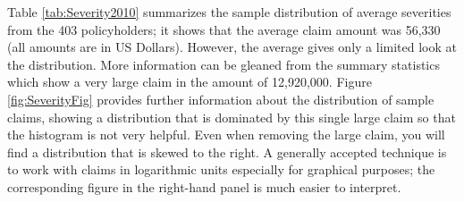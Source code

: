 \documentclass[]{book}
\theoremstyle{definition}
\theoremstyle{definition}
\theoremstyle{definition}
\theoremstyle{remark}
\begin{document}
Table \ref{tab:Severity2010} summarizes the sample distribution of
average severities from the 403 policyholders; it shows that the average
claim amount was 56,330 (all amounts are in US Dollars). However, the
average gives only a limited look at the distribution. More information
can be gleaned from the summary statistics which show a very large claim
in the amount of 12,920,000. Figure \ref{fig:SeverityFig} provides
further information about the distribution of sample claims, showing a
distribution that is dominated by this single large claim so that the
histogram is not very helpful. Even when removing the large claim, you
will find a distribution that is skewed to the right. A generally
accepted technique is to work with claims in logarithmic units
especially for graphical purposes; the corresponding figure in the
right-hand panel is much easier to interpret.
\end{document}
